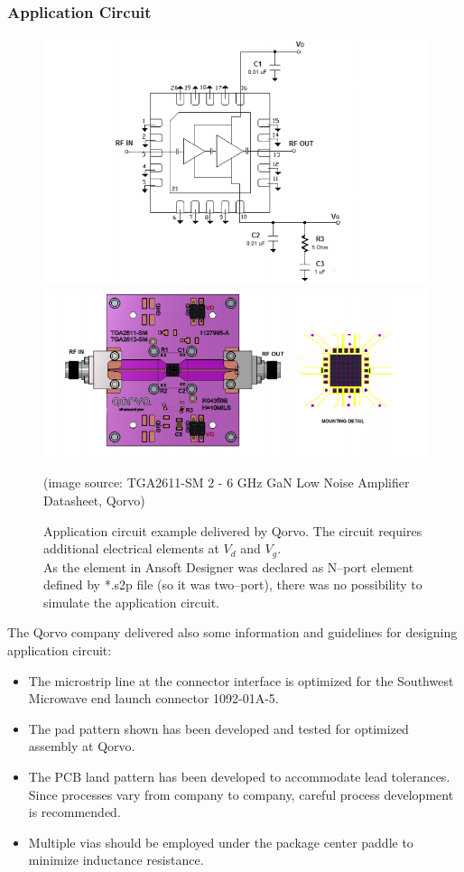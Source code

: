 \documentclass[eng,printmode]{mgr}
\begin{document}
\subsubsection{Application Circuit}
\begin{figure}[h]
	\centering
	\includegraphics[width=0.7\linewidth]{amplifier1}
	\includegraphics[width=0.7\linewidth]{amplifier2}
	\caption{Application circuit example delivered by Qorvo. The circuit requires additional electrical elements at $V_d$ and $V_g$.\\
	As the element in Ansoft Designer was declared as N--port element defined by *.s2p file (so it was two--port), there was no possibility to simulate the application circuit.}\vspace{20pt}	(image source: TGA2611-SM 2 - 6 GHz GaN Low Noise Amplifier Datasheet, Qorvo)
	\label{fig:amplifier1}
\end{figure}

The Qorvo company delivered also some information and guidelines for designing application circuit:
\begin{itemize}
\item The microstrip line at the connector interface is optimized for the Southwest Microwave end launch connector 1092-01A-5.
\item The pad pattern shown has been developed and tested for optimized assembly at Qorvo. 
\item The PCB land pattern has been
developed to accommodate lead tolerances. Since processes vary from company to company, careful process development
is recommended.
\item Multiple vias should be employed under the package center paddle to minimize inductance resistance.
\end{itemize}
\end{document}
